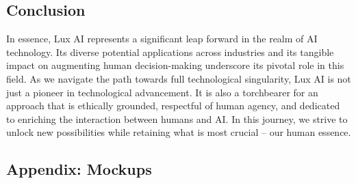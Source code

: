\documentclass[11pt]{article}
\begin{document}
\subsection{Conclusion}

In essence, Lux AI represents a significant leap forward in the realm of AI technology. Its diverse potential applications across industries and its tangible impact on augmenting human decision-making underscore its pivotal role in this field. As we navigate the path towards full technological singularity, Lux AI is not just a pioneer in technological advancement. It is also a torchbearer for an approach that is ethically grounded, respectful of human agency, and dedicated to enriching the interaction between humans and AI. In this journey, we strive to unlock new possibilities while retaining what is most crucial -- our human essence.


\subsection{Appendix: Mockups}
\end{document}
